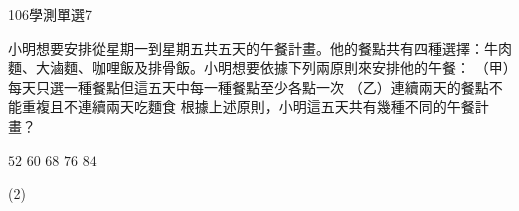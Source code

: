 \begin{QUESTIONS}
\begin{QUESTION}
\begin{QSOLLIST}
        \end{QSOLLIST}
        \begin{QEMPTYSPACE}
        \end{QEMPTYSPACE}
    \end{QUESTION}
    \begin{QUESTION}
        \begin{ExamInfo}{106}{學測}{單選}{7}
        \end{ExamInfo}
        \begin{ExamAnsRateInfo}{29}{40}{27}{20}
        \end{ExamAnsRateInfo}
        \begin{QBODY}
            小明想要安排從星期一到星期五共五天的午餐計畫。他的餐點共有四種選擇：牛肉麵、大滷麵、咖哩飯及排骨飯。小明想要依據下列兩原則來安排他的午餐：
			（甲）每天只選一種餐點但這五天中每一種餐點至少各點一次
			（乙）連續兩天的餐點不能重複且不連續兩天吃麵食
			根據上述原則，小明這五天共有幾種不同的午餐計畫？
			\begin{QOPS}
				\QOP $52$      
				\QOP $60$      
				\QOP $68$      
				\QOP $76$      
				\QOP $84$
			\end{QOPS}
        \end{QBODY}
        \begin{QFROMS}
        \end{QFROMS}
        \begin{QTAGS}\end{QTAGS}
        \begin{QANS}
            (2)
        \end{QANS}
        \begin{QSOLLIST}
            \begin{QSOL}[SOLID=28]
                \begin{QSTEPS}
\end{QSTEPS}
\end{QSOL}
\end{QSOLLIST}
\end{QUESTION}
\end{QUESTIONS}
